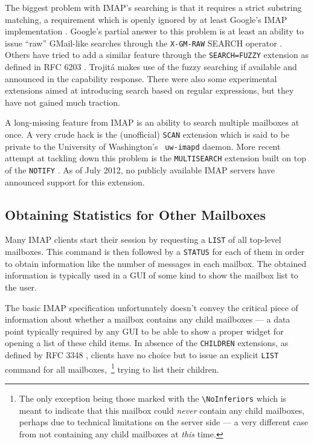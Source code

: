 \documentclass[trojita]{subfiles}
\begin{document}
The biggest problem with IMAP's searching is that it requires a strict substring matching, a requirement which is openly
ignored by at least Google's IMAP implementation \cite{gmail-imap-unsupported-features}.  Google's partial answer to
this problem is at least an ability to issue ``raw'' GMail-like searches through the {\tt X-GM-RAW} SEARCH operator
\cite{gmail-x-gm-raw}.  Others have tried to add a similar feature through the {\tt SEARCH=FUZZY} extension as defined
in RFC 6203 \cite{rfc6203}.  Trojitá makes use of the fuzzy searching if available and announced in the capability
response.  There were also some experimental extensions \cite{draft-ietf-imapext-regex} aimed at introducing search
based on regular expressions, but they have not gained much traction.

A long-missing feature from IMAP is an ability to search multiple mailboxes at once.  A very crude hack is the
(unofficial) {\tt SCAN} extension \cite{crispin-scan} which is said to be private to the University of Washington's {\tt
uw-imapd} daemon.  More recent attempt at tackling down this problem is the {\tt MULTISEARCH} extension \cite{rfc6237}
built on top of the {\tt NOTIFY} \cite{rfc5465}.  As of July 2012, no publicly available IMAP servers have announced
support for this extension.

\subsection{Obtaining Statistics for Other Mailboxes}

Many IMAP clients start their session by requesting a {\tt LIST} of all top-level mailboxes.  This command is then
followed by a {\tt STATUS} for each of them in order to obtain information like the number of messages in each mailbox.
The obtained information is typically used in a GUI of some kind to show the mailbox list to the user.

The basic IMAP specification unfortunately doesn't convey the critical piece of information about whether a mailbox
contains any child mailboxes --- a data point typically required by any GUI to be able to show a proper widget for
opening a list of these child items.  In absence of the {\tt CHILDREN} extensions, as defined by RFC 3348
\cite{rfc3348}, clients have no choice but to issue an explicit {\tt LIST} command for all mailboxes,~\footnote{The only
exception being those marked with the {\tt {\textbackslash}NoInferiors} which is meant to indicate that this mailbox
could {\em never} contain any child mailboxes, perhaps due to technical limitations on the server side --- a very
different case from not containing any child mailboxes at {\em this} time.} trying to list their children.
\end{document}
